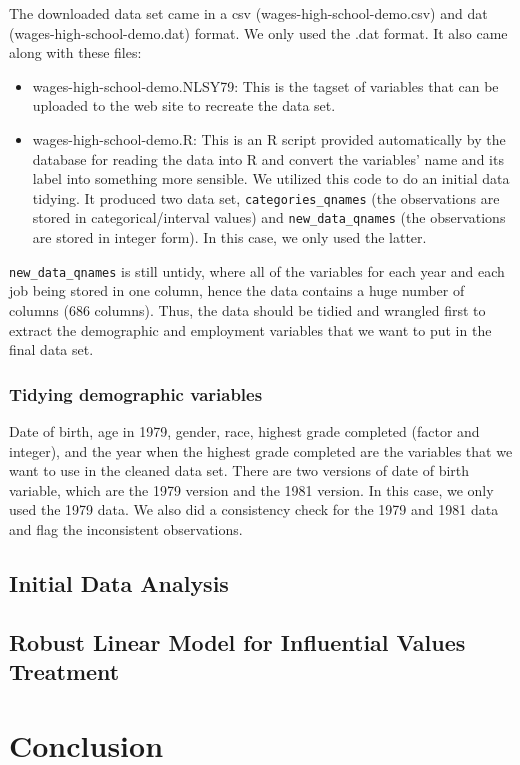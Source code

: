\documentclass{article}
\begin{document}
The downloaded data set came in a csv (wages-high-school-demo.csv) and
dat (wages-high-school-demo.dat) format. We only used the .dat format.
It also came along with these files:

\begin{itemize}
\tightlist
\item
  wages-high-school-demo.NLSY79: This is the tagset of variables that
  can be uploaded to the web site to recreate the data set.
\item
  wages-high-school-demo.R: This is an R script provided automatically
  by the database for reading the data into R and convert the variables'
  name and its label into something more sensible. We utilized this code
  to do an initial data tidying. It produced two data set,
  \texttt{categories\_qnames} (the observations are stored in
  categorical/interval values) and \texttt{new\_data\_qnames} (the
  observations are stored in integer form). In this case, we only used
  the latter.
\end{itemize}

\texttt{new\_data\_qnames} is still untidy, where all of the variables
for each year and each job being stored in one column, hence the data
contains a huge number of columns (686 columns). Thus, the data should
be tidied and wrangled first to extract the demographic and employment
variables that we want to put in the final data set.

\hypertarget{tidying-demographic-variables}{%
\subsubsection{Tidying demographic
variables}\label{tidying-demographic-variables}}

Date of birth, age in 1979, gender, race, highest grade completed
(factor and integer), and the year when the highest grade completed are
the variables that we want to use in the cleaned data set. There are two
versions of date of birth variable, which are the 1979 version and the
1981 version. In this case, we only used the 1979 data. We also did a
consistency check for the 1979 and 1981 data and flag the inconsistent
observations.

\hypertarget{initial-data-analysis}{%
\subsection{Initial Data Analysis}\label{initial-data-analysis}}

\hypertarget{robust-linear-model-for-influential-values-treatment}{%
\subsection{Robust Linear Model for Influential Values
Treatment}\label{robust-linear-model-for-influential-values-treatment}}

\hypertarget{conclusion}{%
\section{Conclusion}\label{conclusion}}



\end{document}
